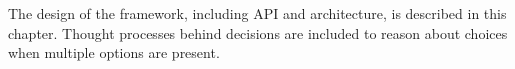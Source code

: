 The design of the framework, including API and architecture, is described in this chapter. Thought processes behind decisions are included to reason about choices when multiple options are present.

%
%
%
